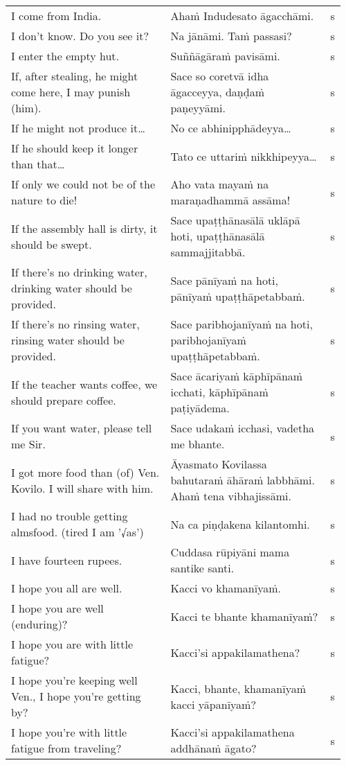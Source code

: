 \documentclass[a5paper]{memoir}
\begin{document}
\begin{longtable}{L{0.48\linewidth} L{0.48\linewidth} H}
I come from India. & Ahaṁ Indudesato āgacchāmi. & s\\[0pt]
I don't know. Do you see it? & Na jānāmi. Taṁ passasi? & s\\[0pt]
I enter the empty hut. & Suññāgāraṁ pavisāmi. & s\\[0pt]
If, after stealing, he might come here, I may punish (him). & Sace so coretvā idha āgacceyya, daṇḍaṁ paṇeyyāmi. & s\\[0pt]
If he might not produce it\ldots{} & No ce abhinipphādeyya\ldots{} & s\\[0pt]
If he should keep it longer than that\ldots{} & Tato ce uttariṁ nikkhipeyya\ldots{} & s\\[0pt]
If only we could not be of the nature to die! & Aho vata mayaṁ na maraṇadhammā assāma! & s\\[0pt]
If the assembly hall is dirty, it should be swept. & Sace upaṭṭhānasālā uklāpā hoti, upaṭṭhānasālā sammajjitabbā. & s\\[0pt]
If there's no drinking water, drinking water should be provided. & Sace pānīyaṁ na hoti, pānīyaṁ upaṭṭhāpetabbaṁ. & s\\[0pt]
If there's no rinsing water, rinsing water should be provided. & Sace paribhojanīyaṁ na hoti, paribhojanīyaṁ upaṭṭhāpetabbaṁ. & s\\[0pt]
If the teacher wants coffee, we should prepare coffee. & Sace ācariyaṁ kāphīpānaṁ icchati, kāphīpānaṁ paṭiyādema. & s\\[0pt]
If you want water, please tell me Sir. & Sace udakaṁ icchasi, vadetha me bhante. & s\\[0pt]
I got more food than (of) Ven. Kovilo. I will share with him. & Āyasmato Kovilassa bahutaraṁ āhāraṁ labbhāmi. Ahaṁ tena vibhajissāmi. & s\\[0pt]
I had no trouble getting almsfood. (tired I am '√as') & Na ca piṇḍakena kilantomhi. & s\\[0pt]
I have fourteen rupees. & Cuddasa rūpiyāni mama santike santi. & s\\[0pt]
I hope you all are well. & Kacci vo khamanīyaṁ. & s\\[0pt]
I hope you are well (enduring)? & Kacci te bhante khamanīyaṁ? & s\\[0pt]
I hope you are with little fatigue? & Kacci'si appakilamathena? & s\\[0pt]
I hope you're keeping well Ven., I hope you're getting by? & Kacci, bhante, khamanīyaṁ kacci yāpanīyaṁ? & s\\[0pt]
I hope you're with little fatigue from traveling? & Kacci'si appakilamathena addhānaṁ āgato? & s\\[0pt]

\end{longtable}
\end{document}
